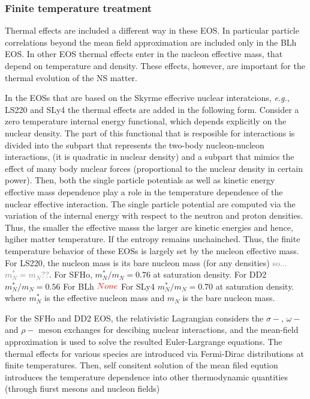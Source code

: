 \documentclass[11pt,a4paper,headinclude=true,DIV=14,BCOR=8mm,chapterprefix,listof=totoc,twoside,openright,abstracton]{scrbook}
\newcommand{\red}[1]{\textcolor{red}{#1}}
\newcommand{\gray}[1]{\textcolor{gray}{#1}}
\begin{document}
\subsubsection{Finite temperature treatment}


Thermal effects are included a different way in these EOS. 
In particular particle correlations beyond the mean field approximation are included only in the BLh EOS.
In other EOS thermal effects enter in the nucleon effective mass, that depend on temperature and density.
These effects, however, are important for the thermal evolution of the NS matter.

In the EOSs that are based on the Skyrme effecrive nuclear interatcions, \textit{e.g.,} LS220 and SLy4
the thermal effects are added in the following form. 
Consider a zero temperature internal energy functional, which depends explicitly on the nuclear density.
The part of this functional that is resposible for interactions is divided into the 
subpart that represents the two-body nucleon-nucleon interactions, (it is quadratic in nuclear density) and a 
subpart that mimics the effect of many body nuclear forces (proportional to the nuclear density in certain power).
Then, both the single particle potentials as well as kinetic energy effective mass dependence play a role
in the temperature dependence of the nuclear effective interaction.
The single particle potential are computed via the variation of the internal energy with respect to the 
neutron and proton densities.
Thus, the smaller the effective masss the larger are kinetic energies and hence, hgiher matter temperature. 
If the entropy remains unchainched.
Thus, the finite temperature behavior of these EOSs is largely set by the nucleon effective mass.
For LS220, the nucleon mass is its bare nucleon mass (for any densities) \gray{so... $m_{N}^*=m_{N}$??}.
For SFHo, $m_N ^* / m_N = 0.76$ at saturation density. 
For DD2 $m_N^*/m_N = 0.56$ 
For BLh $\red{None}$ 
For SLy4 $m_N^*/m_N=0.70$ at saturation density. 
where $m_{N}^*$ is the effective nucleon mass and $m_N$ is the bare nucleon mass.

For the SFHo and DD2 EOS, the relativistic Lagrangian considers the $\sigma-$, $\omega-$ and $\rho-$
meson exchanges for descibing nuclear interactions, and the mean-field approximation is used
to solve the resulted Euler-Largrange equations. 
The thermal effects for various species are introduced via Fermi-Dirac distributions at finite temperatures.
Then, self consitent solution of the mean filed eqution introduces the temperature dependence into other 
thermodynamic quantities (through fiurst mesons and nucleon fields)
\end{document}
